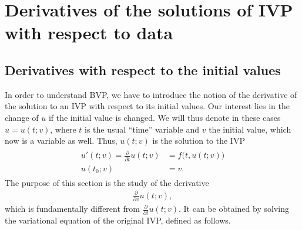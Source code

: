 \section{Derivatives of the solutions of IVP with respect to data}
\subsection{Derivatives with respect to the initial values}
\begin{intro}
  In order to understand BVP, we have to introduce the notion of the
  derivative of the solution to an IVP with respect to its initial
  values. Our interest lies in the change of $u$ if the initial value
  is changed. We will thus denote in these cases $u=u(t;v)$, where $t$ is
  the usual ``time'' variable and $v$ the initial value, which now is
  a variable as well. Thus, $u(t;v)$ is the solution to the IVP
  \begin{gather}
    \label{eq:derivatives:1}
    \begin{split}
      u'(t;v) = \tfrac{\partial}{\partial t} u(t;v) &= f\bigl(t,u(t;v)\bigr) \\
      u(t_0;v) &= v.
    \end{split}
  \end{gather}
  The purpose of this section is the study of the derivative
  \begin{gather*}
    \tfrac{\partial}{\partial v} u(t;v),
  \end{gather*}
  which is fundamentally different from $\tfrac{\partial}{\partial t}
  u(t;v)$.
  It can be obtained by solving the variational equation of the
  original IVP, defined as follows.
\end{intro}


